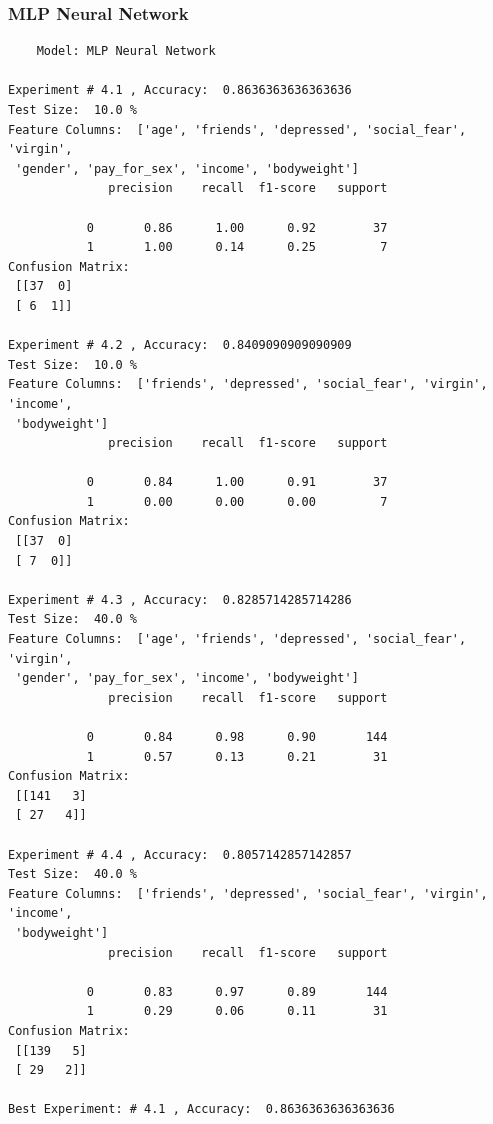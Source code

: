 \documentclass{article}
\begin{document}
\subsubsection{ MLP Neural Network}
\begin{commandline}
	\begin{verbatim}
	Model: MLP Neural Network

Experiment # 4.1 , Accuracy:  0.8636363636363636
Test Size:  10.0 %
Feature Columns:  ['age', 'friends', 'depressed', 'social_fear', 'virgin',
 'gender', 'pay_for_sex', 'income', 'bodyweight']
              precision    recall  f1-score   support

           0       0.86      1.00      0.92        37
           1       1.00      0.14      0.25         7
Confusion Matrix:
 [[37  0]
 [ 6  1]]

Experiment # 4.2 , Accuracy:  0.8409090909090909
Test Size:  10.0 %
Feature Columns:  ['friends', 'depressed', 'social_fear', 'virgin', 'income',
 'bodyweight']
              precision    recall  f1-score   support

           0       0.84      1.00      0.91        37
           1       0.00      0.00      0.00         7
Confusion Matrix:
 [[37  0]
 [ 7  0]]

Experiment # 4.3 , Accuracy:  0.8285714285714286
Test Size:  40.0 %
Feature Columns:  ['age', 'friends', 'depressed', 'social_fear', 'virgin',
 'gender', 'pay_for_sex', 'income', 'bodyweight']
              precision    recall  f1-score   support

           0       0.84      0.98      0.90       144
           1       0.57      0.13      0.21        31
Confusion Matrix:
 [[141   3]
 [ 27   4]]

Experiment # 4.4 , Accuracy:  0.8057142857142857
Test Size:  40.0 %
Feature Columns:  ['friends', 'depressed', 'social_fear', 'virgin', 'income',
 'bodyweight']
              precision    recall  f1-score   support

           0       0.83      0.97      0.89       144
           1       0.29      0.06      0.11        31
Confusion Matrix:
 [[139   5]
 [ 29   2]]

Best Experiment: # 4.1 , Accuracy:  0.8636363636363636

	\end{verbatim}
\end{commandline}
\end{document}
